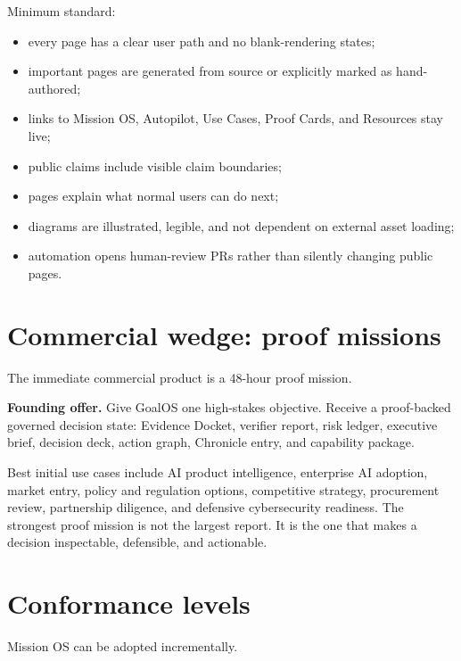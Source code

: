 \documentclass[11pt]{article}
\begin{document}
Minimum standard:
\begin{itemize}
\item every page has a clear user path and no blank-rendering states;
\item important pages are generated from source or explicitly marked as hand-authored;
\item links to Mission OS, Autopilot, Use Cases, Proof Cards, and Resources stay live;
\item public claims include visible claim boundaries;
\item pages explain what normal users can do next;
\item diagrams are illustrated, legible, and not dependent on external asset loading;
\item automation opens human-review PRs rather than silently changing public pages.
\end{itemize}

\section{Commercial wedge: proof missions}
The immediate commercial product is a 48-hour proof mission.

\begin{plaincard}
\textbf{Founding offer.} Give GoalOS one high-stakes objective. Receive a proof-backed governed decision state: Evidence Docket, verifier report, risk ledger, executive brief, decision deck, action graph, Chronicle entry, and capability package.
\end{plaincard}

Best initial use cases include AI product intelligence, enterprise AI adoption, market entry, policy and regulation options, competitive strategy, procurement review, partnership diligence, and defensive cybersecurity readiness. The strongest proof mission is not the largest report. It is the one that makes a decision inspectable, defensible, and actionable.

\section{Conformance levels}
Mission OS can be adopted incrementally.
\end{document}
